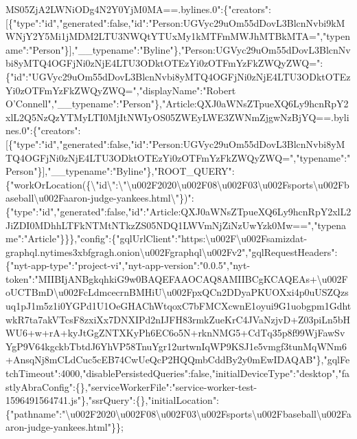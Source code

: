 MS05ZjA2LWNiODg4N2Y0YjM0MA==.bylines.0":\{"creators":{[}\{"type":"id","generated":false,"id":"Person:UGVyc29uOm55dDovL3BlcnNvbi9kMWNjY2Y5Mi1jMDM2LTU3NWQtYTUxMy1kMTFmMWJhMTBkMTA=","typename":"Person"\}{]},"\_\_typename":"Byline"\},"Person:UGVyc29uOm55dDovL3BlcnNvbi8yMTQ4OGFjNi0zNjE4LTU3ODktOTEzYi0zOTFmYzFkZWQyZWQ=":\{"id":"UGVyc29uOm55dDovL3BlcnNvbi8yMTQ4OGFjNi0zNjE4LTU3ODktOTEzYi0zOTFmYzFkZWQyZWQ=","displayName":"Robert
O'Connell","\_\_typename":"Person"\},"Article:QXJ0aWNsZTpueXQ6Ly9hcnRpY2xlL2Q5NzQzYTMyLTI0MjItNWIyOS05ZWEyLWE3ZWNmZjgwNzBjYQ==.bylines.0":\{"creators":{[}\{"type":"id","generated":false,"id":"Person:UGVyc29uOm55dDovL3BlcnNvbi8yMTQ4OGFjNi0zNjE4LTU3ODktOTEzYi0zOTFmYzFkZWQyZWQ=","typename":"Person"\}{]},"\_\_typename":"Byline"\},"ROOT\_QUERY":\{"workOrLocation(\{\textbackslash{}"id\textbackslash{}":\textbackslash{}"\textbackslash{}u002F2020\textbackslash{}u002F08\textbackslash{}u002F03\textbackslash{}u002Fsports\textbackslash{}u002Fbaseball\textbackslash{}u002Faaron-judge-yankees.html\textbackslash{}"\})":\{"type":"id","generated":false,"id":"Article:QXJ0aWNsZTpueXQ6Ly9hcnRpY2xlL2JiZDI0MDhhLTFkNTMtNTkzZS05NDQ1LWVmNjZiNzUwYzk0Mw==","typename":"Article"\}\}\},"config":\{"gqlUrlClient":"https:\textbackslash{}u002F\textbackslash{}u002Fsamizdat-graphql.nytimes3xbfgragh.onion\textbackslash{}u002Fgraphql\textbackslash{}u002Fv2","gqlRequestHeaders":\{"nyt-app-type":"project-vi","nyt-app-version":"0.0.5","nyt-token":"MIIBIjANBgkqhkiG9w0BAQEFAAOCAQ8AMIIBCgKCAQEAs+\textbackslash{}u002FoUCTBmD\textbackslash{}u002FcLdmcecrnBMHiU\textbackslash{}u002FpxQCn2DDyaPKUOXxi4p0uUSZQzsuq1pJ1m5z1i0YGPd1U1OeGHAChWtqoxC7bFMCXcwnE1oyui9G1uobgpm1GdhtwkR7ta7akVTcsF8zxiXx7DNXIPd2nIJFH83rmkZueKrC4JVaNzjvD+Z03piLn5bHWU6+w+rA+kyJtGgZNTXKyPh6EC6o5N+rknNMG5+CdTq35p8f99WjFawSvYgP9V64kgckbTbtdJ6YhVP58TnuYgr12urtwnIqWP9KSJ1e5vmgf3tunMqWNm6+AnsqNj8mCLdCuc5cEB74CwUeQcP2HQQmbCddBy2y0mEwIDAQAB"\},"gqlFetchTimeout":4000,"disablePersistedQueries":false,"initialDeviceType":"desktop","fastlyAbraConfig":\{\},"serviceWorkerFile":"service-worker-test-1596491564741.js"\},"ssrQuery":\{\},"initialLocation":\{"pathname":"\textbackslash{}u002F2020\textbackslash{}u002F08\textbackslash{}u002F03\textbackslash{}u002Fsports\textbackslash{}u002Fbaseball\textbackslash{}u002Faaron-judge-yankees.html"\}\};
